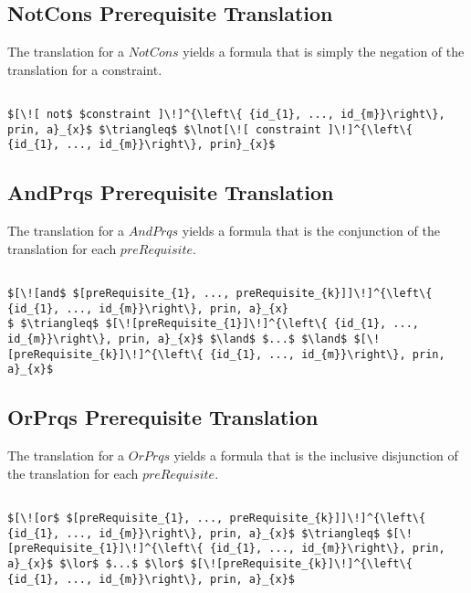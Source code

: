\subsection{NotCons Prerequisite Translation}
The translation for a $NotCons$ yields a formula that is simply the negation of the translation for a constraint.

\lstset{mathescape, language=AST}  
\begin{lstlisting}[frame=single, caption={Prerequisite Translation {$\colon$} Not Constraint},label={lst:transpreRequisiteNotConstraint}]

$[\![ not$ $constraint ]\!]^{\left\{ {id_{1}, ..., id_{m}}\right\}, prin, a}_{x}$ $\triangleq$ $\lnot[\![ constraint ]\!]^{\left\{ {id_{1}, ..., id_{m}}\right\}, prin}_{x}$ 
\end{lstlisting}

\subsection{AndPrqs Prerequisite Translation}
The translation for a $AndPrqs$ yields a formula that is the conjunction of the translation for each $preRequisite$.

\lstset{mathescape, language=AST}  
\begin{lstlisting}[frame=single, caption={Prerequisite Translation {$\colon$} Conjunction },label={lst:transpreRequisiteAndPrqs}]

$[\![and$ $[preRequisite_{1}, ..., preRequisite_{k}]]\!]^{\left\{ {id_{1}, ..., id_{m}}\right\}, prin, a}_{x}
$ $\triangleq$ $[\![preRequisite_{1}]\!]^{\left\{ {id_{1}, ..., id_{m}}\right\}, prin, a}_{x}$ $\land$ $...$ $\land$ $[\![preRequisite_{k}]\!]^{\left\{ {id_{1}, ..., id_{m}}\right\}, prin, a}_{x}$

\end{lstlisting}

\subsection{OrPrqs Prerequisite Translation}
The translation for a $OrPrqs$ yields a formula that is the inclusive disjunction of the translation for each $preRequisite$.

\lstset{mathescape, language=AST}  
\begin{lstlisting}[frame=single, caption={Prerequisite Translation {$\colon$} Inclusive Disjunction},label={lst:transpreRequisiteOrPrqs}]

$[\![or$ $[preRequisite_{1}, ..., preRequisite_{k}]]\!]^{\left\{ {id_{1}, ..., id_{m}}\right\}, prin, a}_{x}$ $\triangleq$ $[\![preRequisite_{1}]\!]^{\left\{ {id_{1}, ..., id_{m}}\right\}, prin, a}_{x}$ $\lor$ $...$ $\lor$ $[\![preRequisite_{k}]\!]^{\left\{ {id_{1}, ..., id_{m}}\right\}, prin, a}_{x}$

\end{lstlisting}

